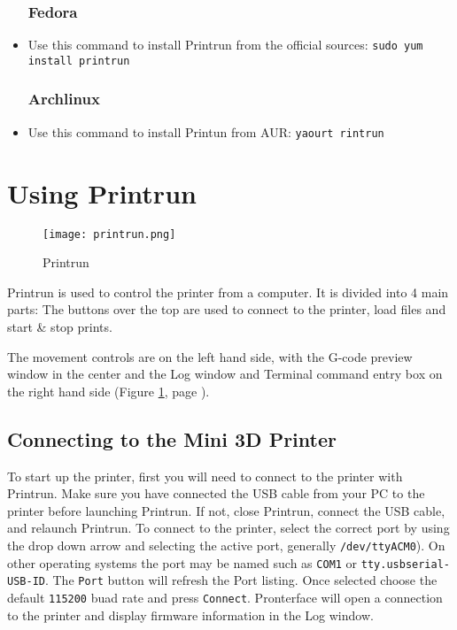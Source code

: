 \begin{itemize}
\subsubsection{Fedora}
\item Use this command to install Printrun from the official sources: \texttt{sudo yum install printrun}

\subsubsection{Archlinux}
\item Use this command to install Printun from AUR: \texttt{yaourt rintrun}

\end{itemize}

\section{Using Printrun}

\begin{figure}[H]
\centering
\texttt{[image: printrun.png]}
\caption{Printrun}
\label{fig:Printrun}
\end{figure}

Printrun is used to control the printer from a computer. It is divided into 4 main parts: The buttons over the top are used to connect to the printer, load files and start \& stop prints.

The movement controls are on the left hand side, with the G-code preview window in the center and the Log window and Terminal command entry box on the right hand side (Figure \ref{fig:Printrun}, page \pageref{fig:Printrun}).

\subsection{Connecting to the Mini 3D Printer}
To start up the printer, first you will need to connect to the printer with Printrun. Make sure you have connected the USB cable from your PC to the printer before launching Printrun. If not, close Printrun, connect the USB cable, and relaunch Printrun. To connect to the printer, select the correct port by using the drop down arrow and selecting the active port, generally \texttt{/dev/ttyACM0}). On other operating systems the port may be named such as \texttt{COM1} or \texttt{tty.usbserial-USB-ID}. The \texttt{Port} button will refresh the Port listing. Once selected choose the default \texttt{115200} buad rate and press \texttt{Connect}. Pronterface will open a connection to the printer and display firmware information in the Log window. 

